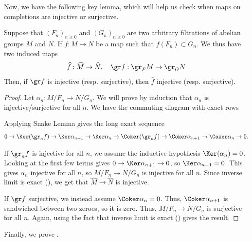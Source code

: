 Now, we have the following key lemma, which will
help us check when maps on completions are injective
or surjective.
\begin{lemma}
    \label{lem:gr_injective_surjective}
    Suppose that $(F_n)_{n\geq 0}$ and $(G_n)_{n\geq 0}$ are two arbitrary filtrations of abelian groups $M$ and $N$.
    If $f : M\to N$ be a map such that $f(F_n)\subset G_n$.
    We thus have two induced maps
    $$\widehat f : \widehat M\to\widehat N
    ,\quad \gr f
    : \gr_F M \to \gr_G N$$
    Then, if $\gr f$ is injective (resp. surjective),
    then $\widehat f$ injective (resp. surjective).
\end{lemma}
\begin{proof}
    Let $\alpha_n : M/F_n\to N/G_n$.
    We will prove by induction that $\alpha_n$ is
    injective/surjective for all $n$.
    We have the commuting diagram with exact rows
    \begin{center}
    \end{center}
    Applying Snake Lemma  
    gives the long exact sequence
    $$0\to \Ker( \gr_n f) \to \Ker \alpha_{n+1}
    \to \Ker \alpha_n \to \Coker( \gr_n f)
    \to \Coker \alpha_{n+1} \to \Coker \alpha_n\to 0.$$
    
    If $\gr_n f$ is injective for all $n$,
    we assume the inductive hypothesis $\Ker(\alpha_n)=0$.
    Looking at the first few terms gives
    $0\to \Ker\alpha_{n+1}\to 0$, so
    $\Ker\alpha_{n+1}=0$.
    This gives $\alpha_n$ injective for all $n$,
    so $M/F_n\to N/G_n$ is injective for all $n$.
    Since inverse limit is exact (),
    we get that $\widehat M\to \widehat N$ is injective.

    If $\gr f$ surjective,
    we instead assume $\Coker\alpha_n = 0$.
    Thus, $\Coker\alpha_{n+1}$ is sandwiched
    between two zeroes, so it is zero.
    Thus, $M/F_n\to N/G_n$ is surjective for all $n$.
    Again, using the fact that inverse limit
    is exact () gives the result.
\end{proof}
Finally, we prove .
